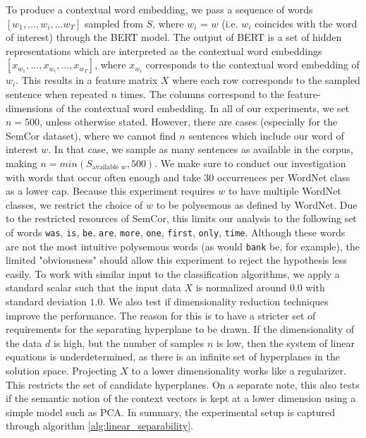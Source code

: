 \documentclass[a4paper,12pt,oneside,openright]{report}
\begin{document}
To produce a contextual word embedding, we pass a sequence of words $[w_1, \ldots, w_i, \ldots w_T]$ sampled from $S$, where $w_i$ = $w$ (i.e. $w_i$ coincides with the word of interest) through the BERT model.
The output of BERT is a set of hidden representations which are interpreted as the contextual word embeddings $[x_{w_1}, \ldots, x_{w_i}, \ldots, x_{w_T}]$, where $x_{w_i}$ corresponds to the contextual word embedding of $w_i$.
This results in a feature matrix $X$ where each row corresponds to the sampled sentence when repeated $n$ times.
The columns correspond to the feature-dimensions of the contextual word embedding.
In all of our experiments, we set $n=500$, unless otherwise stated.
However, there are cases (especially for the SemCor dataset), where we cannot find $n$ sentences which include our word of interest $w$. 
In that case, we sample as many sentences as available in the corpus, making $n=min( S_{\text{available }w}, 500)$.
We make sure to conduct our investigation with words that occur often enough and take 30 occurrences per WordNet class as a lower cap.
Because this experiment requires $w$ to have multiple WordNet classes, we restrict the choice of $w$ to be polysemous as defined by WordNet.
Due to the restricted resources of SemCor, this limits our analysis to the following set of words \texttt{was}, \texttt{is}, \texttt{be}, \texttt{are}, \texttt{more}, \texttt{one}, \texttt{first}, \texttt{only}, \texttt{time}.
Although these words are not the most intuitive polysemous words (as would \Verb#bank# be, for example), the limited "obviousness" should allow this experiment to reject the hypothesis less easily.
To work with similar input to the classification algorithms, we apply a standard scalar such that the input data $X$ is normalized around $0.0$ with standard deviation $1.0$.
We also test if dimensionality reduction techniques improve the performance.
The reason for this is to have a stricter set of requirements for the separating hyperplane to be drawn.
If the dimensionality of the data $d$ is high, but the number of samples $n$ is low, then the system of linear equations is underdetermined, as there is an infinite set of hyperplanes in the solution space.
Projecting $X$ to a lower dimensionality works like a regularizer. This restricts the set of candidate hyperplanes.
On a separate note, this also tests if the semantic notion of the context vectors is kept at a lower dimension using a simple model such as PCA.
In summary, the experimental setup is captured through algorithm \ref{alg:linear_separability}. \\
\end{document}
